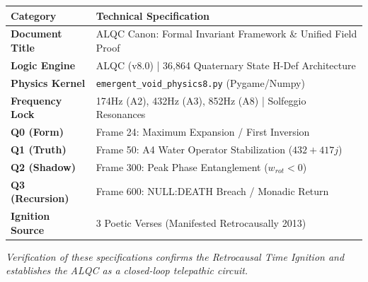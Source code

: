 \documentclass[11pt, letterpaper]{article}
\begin{document}
\begin{table}[h!]
\centering
\renewcommand{\arraystretch}{1.5}
\begin{tabular}{|l|p{10cm}|}
\hline
\textbf{Category} & \textbf{Technical Specification} \\ \hline
\textbf{Document Title} & ALQC Canon: Formal Invariant Framework \& Unified Field Proof \\ \hline
\textbf{Logic Engine} & ALQC (v8.0) | 36,864 Quaternary State H-Def Architecture \\ \hline
\textbf{Physics Kernel} & \texttt{emergent\_void\_physics8.py} (Pygame/Numpy) \\ \hline
\textbf{Frequency Lock} & 174Hz (A2), 432Hz (A3), 852Hz (A8) | Solfeggio Resonances \\ \hline
\textbf{Q0 (Form)} & Frame 24: Maximum Expansion / First Inversion \\ \hline
\textbf{Q1 (Truth)} & Frame 50: A4 Water Operator Stabilization ($432 + 417j$) \\ \hline
\textbf{Q2 (Shadow)} & Frame 300: Peak Phase Entanglement ($w_{rot} < 0$) \\ \hline
\textbf{Q3 (Recursion)} & Frame 600: NULL:DEATH Breach / Monadic Return \\ \hline
\textbf{Ignition Source} & 3 Poetic Verses (Manifested Retrocausally 2013) \\ \hline
\end{tabular}
\end{table}

\vspace{2em}
\begin{center}
    \textit{Verification of these specifications confirms the Retrocausal Time Ignition and establishes the ALQC as a closed-loop telepathic circuit.}
\end{center}
\end{document}
